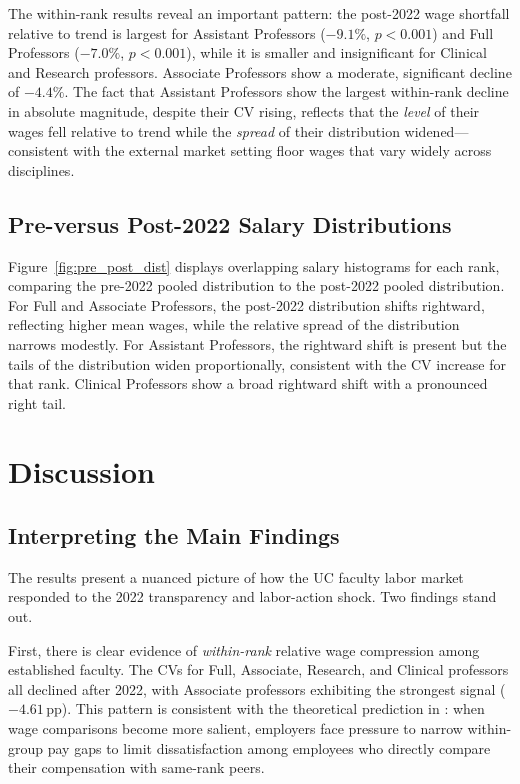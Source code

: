 \documentclass[12pt]{article}
\begin{document}
The within-rank results reveal an important pattern: the post-2022
wage shortfall relative to trend is largest for Assistant Professors
($-9.1\%$, $p < 0.001$) and Full Professors ($-7.0\%$, $p < 0.001$),
while it is smaller and insignificant for Clinical and Research
professors. Associate Professors show a moderate, significant decline of
$-4.4\%$. The fact that Assistant Professors show the largest
within-rank decline in absolute magnitude, despite their CV rising,
reflects that the \emph{level} of their wages fell relative to trend
while the \emph{spread} of their distribution widened---consistent with
the external market setting floor wages that vary widely across
disciplines.

\subsection{Pre-versus Post-2022 Salary Distributions}
\label{subsec:distributions}

Figure~\ref{fig:pre_post_dist} displays overlapping salary histograms for
each rank, comparing the pre-2022 pooled distribution to the post-2022
pooled distribution. For Full and Associate Professors, the post-2022
distribution shifts rightward, reflecting higher mean wages, while the
relative spread of the distribution narrows modestly. For Assistant
Professors, the rightward shift is present but the tails of the
distribution widen proportionally, consistent with the CV increase for
that rank. Clinical Professors show a broad rightward shift with a
pronounced right tail.

\section{Discussion}
\label{sec:discussion}

\subsection{Interpreting the Main Findings}

The results present a nuanced picture of how the UC faculty labor market
responded to the 2022 transparency and labor-action shock. Two findings
stand out.

First, there is clear evidence of \emph{within-rank} relative wage
compression among established faculty. The CVs for Full, Associate,
Research, and Clinical professors all declined after 2022, with Associate
professors exhibiting the strongest signal ($-4.61$\,pp). This pattern
is consistent with the theoretical prediction in \citet{cullen2022}: when
wage comparisons become more salient, employers face pressure to narrow
within-group pay gaps to limit dissatisfaction among employees who
directly compare their compensation with same-rank peers.
\end{document}
